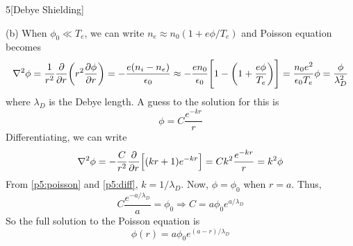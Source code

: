 \documentclass[12pt]{article}
\begin{document}
\begin{problem}{5}[Debye Shielding]
\begin{solution}
    (b) When $\phi_0\ll T_e$, we can write $n_e\approx n_0(1+e\phi/T_e)$ and
    Poisson equation becomes
    \begin{equation}\label{p5:poisson}
        \laplacian\phi
        =\frac1{r^2}\frac{\partial}{\partial r}
            \qty(r^2\frac{\partial\phi}{\partial r})
        =-\frac{e(n_i-n_e)}{\epsilon_0}
        \approx-\frac{en_0}{\epsilon_0}\qty[1-\qty(1+\frac{e\phi}{T_e})]
        =\frac{n_0e^2}{\epsilon_0T_e}\phi
        =\frac{\phi}{\lambda_D^2}
    \end{equation}
    where $\lambda_D$ is the Debye length. A guess to the solution for this is
    \begin{equation}
        \phi=C\frac{e^{-kr}}{r} 
    \end{equation}
    Differentiating, we can write
    \begin{equation}\label{p5:diff}
        \laplacian\phi=-\frac{C}{r^2}\frac{\partial}{\partial r}
            \qty[(kr+1)e^{-kr}]
            =Ck^2\frac{e^{-kr}}{r}=k^2\phi
    \end{equation}
    From \eqref{p5:poisson} and \eqref{p5:diff}, $k=1/\lambda_D$. Now,
    $\phi=\phi_0$ when $r=a$. Thus,
    \begin{equation}
        C\frac{e^{-a/\lambda_D}}{a}=\phi_0\Rightarrow
        C=a\phi_0e^{a/\lambda_D}
    \end{equation}
    So the full solution to the Poisson equation is
    \begin{equation}
        \phi(r)=a\phi_0e^{(a-r)/\lambda_D} 
    \end{equation}
\end{solution}

\end{problem}
\end{document}
